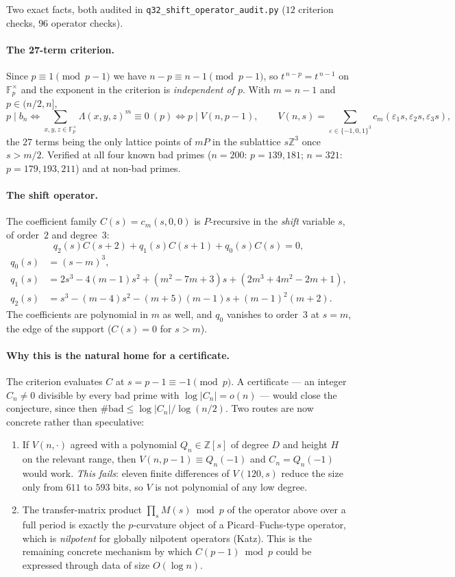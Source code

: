 Two exact facts, both audited in \texttt{q32\_shift\_operator\_audit.py} ($12$ criterion
checks, $96$ operator checks).

\paragraph{The 27-term criterion.}  Since $p\equiv1\pmod{p-1}$ we have
$n-p\equiv n-1\pmod{p-1}$, so $t^{\,n-p}=t^{\,n-1}$ on $\mathbb F_p^\times$ and the exponent
in the criterion is \emph{independent of $p$}.  With $m=n-1$ and $p\in(n/2,n]$,
\[
  p\mid b_n
  \iff \sum_{x,y,z\in\mathbb F_p^\times}\Lambda(x,y,z)^m\equiv0\ (p)
  \iff p\mid V(n,p-1),\qquad
  V(n,s)=\!\!\sum_{\varepsilon\in\{-1,0,1\}^3}\!\! c_m(\varepsilon_1s,\varepsilon_2s,\varepsilon_3s),
\]
the $27$ terms being the only lattice points of $mP$ in the sublattice $s\mathbb Z^3$ once
$s>m/2$.  Verified at all four known bad primes ($n=200$: $p=139,181$; $n=321$:
$p=179,193,211$) and at non-bad primes.

\paragraph{The shift operator.}  The coefficient family $C(s)=c_m(s,0,0)$ is $P$-recursive in
the \emph{shift} variable $s$, of order~$2$ and degree~$3$:
\[
  \boxed{\;q_2(s)C(s+2)+q_1(s)C(s+1)+q_0(s)C(s)=0,\;}
\]
\[
\begin{aligned}
 q_0(s)&=(s-m)^3,\\
 q_1(s)&=2s^3-4(m-1)s^2+(m^2-7m+3)s+(2m^3+4m^2-2m+1),\\
 q_2(s)&=s^3-(m-4)s^2-(m+5)(m-1)s+(m-1)^2(m+2).
\end{aligned}
\]
The coefficients are polynomial in $m$ as well, and $q_0$ vanishes to order~$3$ at $s=m$, the
edge of the support ($C(s)=0$ for $s>m$).

\paragraph{Why this is the natural home for a certificate.}  The criterion evaluates $C$ at
$s=p-1\equiv-1\pmod p$.  A certificate — an integer $C_n\ne0$ divisible by every bad prime with
$\log|C_n|=o(n)$ — would close the conjecture, since then
$\#\text{bad}\le\log|C_n|/\log(n/2)$.  Two routes are now concrete rather than speculative:
\begin{enumerate}
\item If $V(n,\cdot)$ agreed with a polynomial $Q_n\in\mathbb Z[s]$ of degree $D$ and height
$H$ on the relevant range, then $V(n,p-1)\equiv Q_n(-1)$ and $C_n=Q_n(-1)$ would work.
\emph{This fails}: eleven finite differences of $V(120,s)$ reduce the size only from $611$ to
$593$ bits, so $V$ is not polynomial of any low degree.
\item The transfer-matrix product $\prod_{s}M(s)\bmod p$ of the operator above over a full
period is exactly the $p$-curvature object of a Picard--Fuchs-type operator, which is
\emph{nilpotent} for globally nilpotent operators (Katz).  This is the remaining concrete
mechanism by which $C(p-1)\bmod p$ could be expressed through data of size $O(\log n)$.
\end{enumerate}


